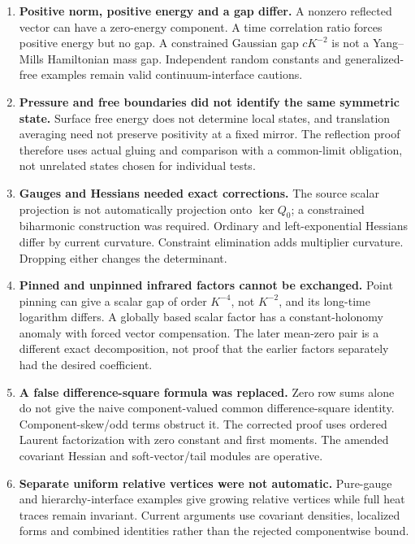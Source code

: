 \documentclass[11pt]{article}
\theoremstyle{remark}
\begin{document}
\begin{enumerate}
\item \textbf{Positive norm, positive
energy and a gap differ.}
A nonzero reflected vector can have
a zero-energy component. A time
correlation ratio forces positive
energy but no gap. A constrained
Gaussian gap \(cK^{-2}\) is not a
Yang--Mills Hamiltonian mass gap.
Independent random constants and
generalized-free examples remain
valid continuum-interface cautions.

\item \textbf{Pressure and free
boundaries did not identify the
same symmetric state.}
Surface free energy does not determine
local states, and translation averaging
need not preserve positivity at a
fixed mirror. The reflection proof
therefore uses actual gluing and
comparison with a common-limit
obligation, not unrelated states
chosen for individual tests.

\item \textbf{Gauges and Hessians
needed exact corrections.}
The source scalar projection is not
automatically projection onto
\(\ker Q_0\); a constrained biharmonic
construction was required.
Ordinary and left-exponential
Hessians differ by current curvature.
Constraint elimination adds multiplier
curvature. Dropping either changes
the determinant.

\item \textbf{Pinned and unpinned
infrared factors cannot be exchanged.}
Point pinning can give a scalar gap
of order \(K^{-4}\), not \(K^{-2}\),
and its long-time logarithm differs.
A globally based scalar factor has
a constant-holonomy anomaly with
forced vector compensation.
The later mean-zero pair is a
different exact decomposition, not
proof that the earlier factors
separately had the desired coefficient.

\item \textbf{A false difference-square
formula was replaced.}
Zero row sums alone do not give
the naive component-valued common
difference-square identity.
Component-skew/odd terms obstruct it.
The corrected proof uses ordered
Laurent factorization with zero
constant and first moments.
The amended covariant Hessian and
soft-vector/tail modules are operative.

\item \textbf{Separate uniform
relative vertices were not automatic.}
Pure-gauge and hierarchy-interface
examples give growing relative
vertices while full heat traces
remain invariant. Current arguments
use covariant densities, localized
forms and combined identities rather
than the rejected componentwise bound.


\end{enumerate}
\end{document}
